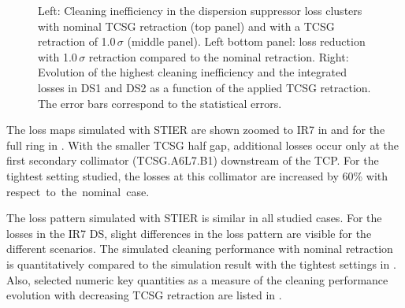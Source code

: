 \begin{figure}[htbp]
	\begin{minipage}{0.5\textwidth} 
  \centering
	\end{minipage}
	\hfill
	\begin{minipage}{0.5\textwidth}
  \centering
	\end{minipage}
	\caption{Left: Cleaning inefficiency in the dispersion suppressor loss clusters with nominal TCSG retraction (top panel) and with a TCSG retraction of 1.0$\,\sigma$ (middle panel). Left bottom panel: loss reduction with 1.0$\,\sigma$ retraction compared to the nominal retraction. Right: Evolution of the highest cleaning inefficiency and the integrated losses in DS1 and DS2 as a function of the applied TCSG retraction. The error bars correspond to the statistical errors.}
	\label{pic:quantiative_TCSG_reduction} 
\end{figure}


The loss maps simulated with STIER are shown zoomed to IR7 in  and for the full ring in . With the smaller TCSG half gap, additional losses occur only at the first secondary collimator (TCSG.A6L7.B1) downstream of the TCP. For the tightest setting studied, the losses at this collimator are increased by 60\% with \mbox{respect to the nominal case}. 


The loss pattern simulated with STIER is similar in all studied cases. For the losses in the IR7 DS, slight differences in the loss pattern are visible for the different scenarios. The simulated cleaning performance with nominal retraction is quantitatively compared to the simulation result with the tightest settings in . Also, selected numeric key quantities as a measure of the cleaning performance evolution with decreasing TCSG retraction are listed in . 

